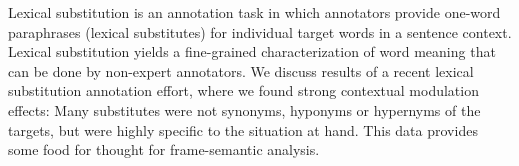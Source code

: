 Lexical substitution is an annotation task in which annotators provide one-word paraphrases (lexical substitutes) for individual target words in a sentence context. Lexical substitution yields a fine-grained characterization of word meaning that can be done by non-expert annotators. We discuss results of a recent lexical substitution annotation effort, where we found strong contextual modulation effects: Many substitutes were not synonyms, hyponyms or hypernyms of the targets, but were highly specific to the situation at hand. This data provides some food for thought for frame-semantic analysis.
